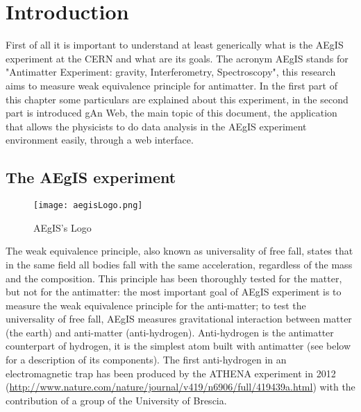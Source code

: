 
\chapter{Introduction} %

\label{Chapter1} %


First of all it is important to understand at least generically what is the AEgIS experiment at the CERN and what are its goals. The acronym AEgIS stands for "Antimatter Experiment: gravity, Interferometry, Spectroscopy", this research aims to measure weak equivalence principle for antimatter. In the first part of this chapter some particulars are explained about this experiment, in the second part is introduced gAn Web, the main topic of this document, the application that allows the physicists to do data analysis in the AEgIS experiment environment easily, through a web interface. 

\section{The AEgIS experiment}


\begin{figure}[H]
\centering
\texttt{[image: aegisLogo.png]} 
\caption{AEgIS's Logo}
\end{figure}

The weak equivalence principle, also known as universality of free fall, states that in the same field all bodies fall with the same acceleration, regardless of the mass and the composition. This principle has been thoroughly tested for the matter, but not for the antimatter: the most important goal of AEgIS experiment is to measure the weak equivalence principle for the anti-matter; to test the universality of free fall, AEgIS measures gravitational interaction between matter (the earth) and anti-matter (anti-hydrogen). Anti-hydrogen is the antimatter counterpart of hydrogen, it is the simplest atom built with antimatter (see below for a description of its components). The first anti-hydrogen in an electromagnetic trap has been produced by the ATHENA experiment in 2012 (\url{http://www.nature.com/nature/journal/v419/n6906/full/419439a.html})
with the contribution of a group of the University of Brescia.

